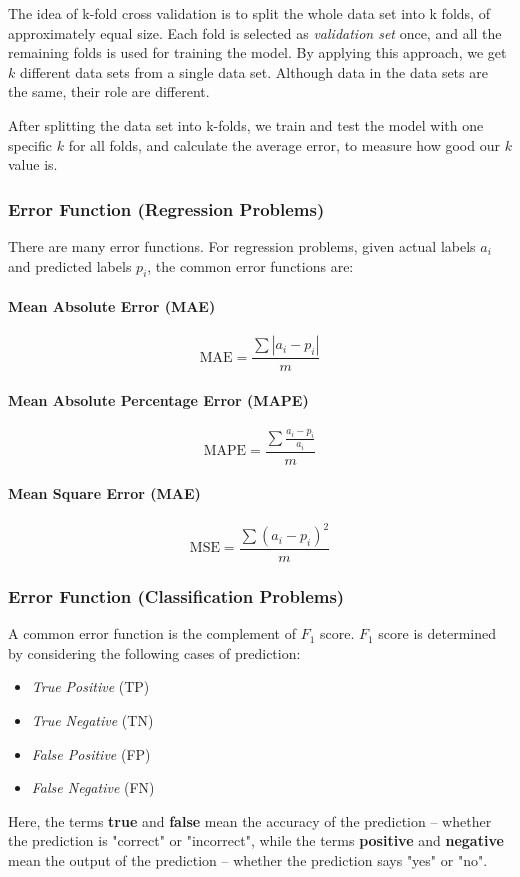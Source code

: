 \documentclass{note}
\begin{document}
The idea of k-fold cross validation is to split the whole data set into k folds, of approximately equal size. Each fold is selected as \textit{validation set} once, and all the remaining folds is used for training the model. By applying this approach, we get $k$ different data sets from a single data set. Although data in the data sets are the same, their role are different. 

After splitting the data set into k-folds, we train and test the model with one specific $k$ for all folds, and calculate the average error, to measure how good our $k$ value is.

\subsubsection{Error Function (Regression Problems)}

There are many error functions. For regression problems, given actual labels $a_i$ and predicted labels $p_i$, the common error functions are: 

\paragraph{Mean Absolute Error (MAE)}
$$
\text{MAE} = \frac{\sum |a_i - p_i|}{m}
$$

\paragraph{Mean Absolute Percentage Error (MAPE)}
$$
\text{MAPE} = \frac{\sum \frac{a_i - p_i}{a_i}}{m}
$$

\paragraph{Mean Square Error (MAE)}
$$
\text{MSE} = \frac{\sum (a_i - p_i)^2}{m}
$$

\subsubsection{Error Function (Classification Problems)}

A common error function is the complement of $F_1$ score. $F_1$ score is determined by considering the following cases of prediction: 
\begin{itemize}
    \item \textit{True Positive} (TP)
    \item \textit{True Negative} (TN)
    \item \textit{False Positive} (FP)
    \item \textit{False Negative} (FN)
\end{itemize}
Here, the terms \textbf{true} and \textbf{false} mean the accuracy of the prediction -- whether the prediction is "correct" or "incorrect", while the terms \textbf{positive} and \textbf{negative} mean the output of the prediction -- whether the prediction says "yes" or "no".
\end{document}
